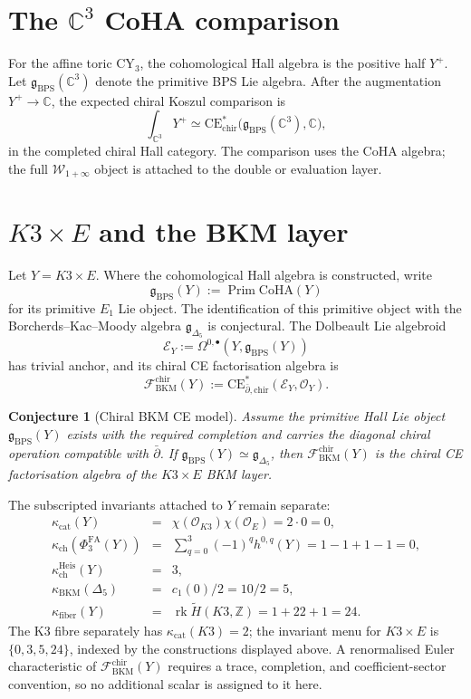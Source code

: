 \documentclass[11pt]{amsart}
\providecommand{\C}{\mathbb{C}}
\providecommand{\Z}{\mathbb{Z}}
\providecommand{\dbar}{\bar{\partial}}
\providecommand{\gBPS}{\mathfrak{g}_{\mathrm{BPS}}}
\providecommand{\CE}{\mathrm{CE}}
\providecommand{\chir}{\mathrm{chir}}
\providecommand{\cE}{\mathcal{E}}
\providecommand{\cO}{\mathcal{O}}
\providecommand{\cF}{\mathcal{F}}
\providecommand{\CoHA}{\mathrm{CoHA}}
\providecommand{\PhiFA}{\Phi^{\mathrm{FA}}}
\providecommand{\kch}{\kappa_{\mathrm{ch}}}
\providecommand{\kBKM}{\kappa_{\mathrm{BKM}}}
\providecommand{\kcat}{\kappa_{\mathrm{cat}}}
\providecommand{\kfiber}{\kappa_{\mathrm{fiber}}}
\theoremstyle{plain}
\newtheorem{conjecture}[theorem]{Conjecture}
\theoremstyle{definition}
\theoremstyle{remark}
\begin{document}
\section{The \texorpdfstring{$\C^3$}{C3} CoHA comparison}
For the affine toric CY$_3$, the cohomological Hall algebra is the
positive half $Y^+$. Let $\gBPS(\C^3)$ denote the primitive BPS Lie
algebra. After the augmentation $Y^+\to\C$, the expected chiral
Koszul comparison is
\[
  \int_{\C^3} Y^+
  \simeq
  \CE^*_{\chir}\!\bigl(\gBPS(\C^3),\C\bigr),
\]
in the completed chiral Hall category. The comparison uses the CoHA
algebra; the full $\mathcal{W}_{1+\infty}$ object is attached to the
double or evaluation layer.

\section{\texorpdfstring{$K3 \times E$}{K3 x E} and the BKM layer}
Let $Y=K3\times E$. Where the cohomological Hall algebra is constructed,
write
\[
  \gBPS(Y):=\operatorname{Prim}\CoHA(Y)
\]
for its primitive $E_1$ Lie object. The identification of this primitive
object with the Borcherds--Kac--Moody algebra
$\mathfrak g_{\Delta_5}$ is conjectural. The Dolbeault Lie algebroid
\[
  \cE_Y:=\Omega^{0,\bullet}(Y,\gBPS(Y))
\]
has trivial anchor, and its chiral CE factorisation algebra is
\[
  \cF^{\chir}_{\mathrm{BKM}}(Y)
  :=
  \CE^*_{\dbar,\chir}(\cE_Y,\cO_Y).
\]

\begin{conjecture}[Chiral BKM CE model]\label{conj:chiral-bkm-ce-model}
Assume the primitive Hall Lie object $\gBPS(Y)$ exists with the required
completion and carries the diagonal chiral operation compatible with
$\dbar$. If $\gBPS(Y)\simeq\mathfrak g_{\Delta_5}$, then
$\cF^{\chir}_{\mathrm{BKM}}(Y)$ is the chiral CE factorisation algebra
of the $K3\times E$ BKM layer.
\end{conjecture}

The subscripted invariants attached to $Y$ remain separate:
\[
\begin{array}{ccl}
 \kcat(Y) &=& \chi(\cO_{K3})\chi(\cO_E)=2\cdot0=0,\\[2mm]
 \kch(\PhiFA_3(Y)) &=&
   \displaystyle\sum_{q=0}^3(-1)^q h^{0,q}(Y)
   =1-1+1-1=0,\\[2mm]
 \kch^{\mathrm{Heis}}(Y) &=& 3,\\[1mm]
 \kBKM(\Delta_5) &=& c_1(0)/2=10/2=5,\\[1mm]
 \kfiber(Y) &=& \operatorname{rk}\widetilde H(K3,\Z)
   =1+22+1=24.
\end{array}
\]
The K3 fibre separately has $\kcat(K3)=2$; the invariant menu for
$K3\times E$ is $\{0,3,5,24\}$, indexed by the constructions displayed
above. A renormalised Euler characteristic of
$\cF^{\chir}_{\mathrm{BKM}}(Y)$ requires a trace, completion, and
coefficient-sector convention, so no additional scalar is assigned to it
here.
\end{document}
